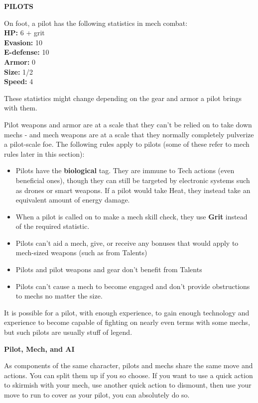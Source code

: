 \begin{center}
    \textbf{PILOTS}    
\end{center}
On foot, a pilot has the following statistics in mech combat:\\
\quad\quad\textbf{HP:} 6 + grit\\
\quad\quad\textbf{Evasion:} 10\\
\quad\quad\textbf{E-defense:} 10\\
\quad\quad\textbf{Armor:} 0\\
\quad\quad\textbf{Size:} 1/2\\
\quad\quad\textbf{Speed:} 4

These statistics might change depending on the gear and armor a pilot brings with them.

Pilot weapons and armor are at a scale that they can't be relied on to take down mechs - and mech weapons are at a scale that they normally completely pulverize a pilot-scale foe. The following rules apply to pilots (some of these refer to mech rules later in this section):
\begin{itemize}
\item Pilots have the \textbf{biological} tag. They are immune to Tech actions (even beneficial ones), though they can still be targeted by electronic systems such as drones or smart weapons. If a pilot would take Heat, they instead take an equivalent amount of energy damage.
\item When a pilot is called on to make a mech skill check, they use \textbf{Grit} instead of the required statistic.
\item Pilots can't aid a mech, give, or receive any bonuses that would apply to mech-sized weapons (such as from Talents)
\item Pilots and pilot weapons and gear don't benefit from Talents
\item Pilots can't cause a mech to become engaged and don't provide obstructions to mechs no matter the size.
\end{itemize}

It is possible for a pilot, with enough experience, to gain enough technology and experience to become capable of fighting on nearly even terms with some mechs, but such pilots are usually stuff of legend.

\begin{center}
    \textbf{Pilot, Mech, and AI}    
\end{center}

As components of the same character, pilots and mechs share the same move and actions. You can split them up if you so choose. If you want to use a quick action to skirmish with your mech, use another quick action to dismount, then use your move to run to cover as your pilot, you can absolutely do so.

